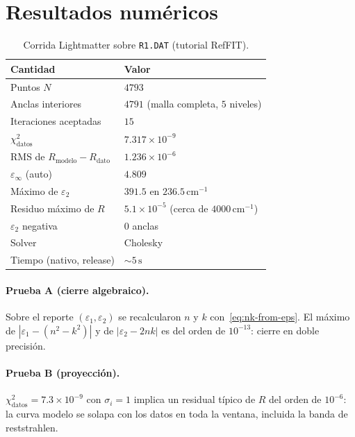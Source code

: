 \section{Resultados num\'ericos}

\begin{table}[H]
\centering
\caption{Corrida Lightmatter sobre \texttt{R1.DAT} (tutorial RefFIT).}
\label{tab:r1-lm}
\begin{tabular}{@{}ll@{}}
\toprule
Cantidad & Valor \\
\midrule
Puntos $N$ & $4793$ \\
Anclas interiores & $4791$ (malla completa, $5$ niveles) \\
Iteraciones aceptadas & $15$ \\
$\chi^{2}_{\mathrm{datos}}$ & $7.317\times 10^{-9}$ \\
RMS de $R_{\mathrm{modelo}}-R_{\mathrm{dato}}$ & $1.236\times 10^{-6}$ \\
$\varepsilon_\infty$ (auto) & $4.809$ \\
M\'aximo de $\varepsilon_2$ & $391.5$ en $236.5\,\mathrm{cm}^{-1}$ \\
Residuo m\'aximo de $R$ & $5.1\times 10^{-5}$ (cerca de $4000\,\mathrm{cm}^{-1}$) \\
$\varepsilon_2$ negativa & $0$ anclas \\
Solver & Cholesky \\
Tiempo (nativo, release) & $\sim 5\,\mathrm{s}$ \\
\bottomrule
\end{tabular}
\end{table}

\paragraph{Prueba A (cierre algebraico).}
Sobre el reporte $(\varepsilon_1,\varepsilon_2)$ se recalcularon $n$ y $k$ con~\eqref{eq:nk-from-eps}.
El m\'aximo de $|\varepsilon_1-(n^{2}-k^{2})|$ y de $|\varepsilon_2-2nk|$ es del orden de $10^{-13}$: cierre en doble precisi\'on.

\paragraph{Prueba B (proyecci\'on).}
$\chi^{2}_{\mathrm{datos}}=7.3\times 10^{-9}$ con $\sigma_i=1$ implica un residual t\'ipico de $R$ del orden de $10^{-6}$: la curva modelo se solapa con los datos en toda la ventana, incluida la banda de reststrahlen.

